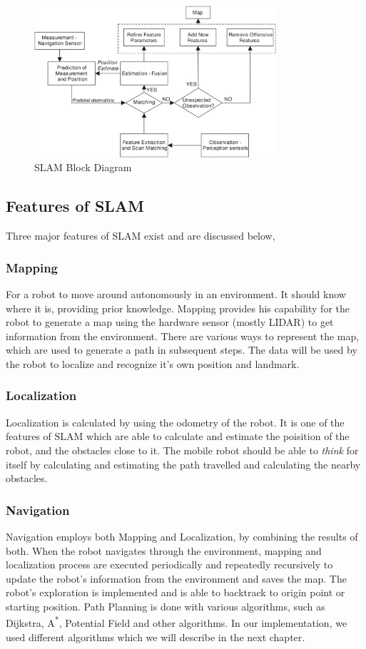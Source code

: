\begin{figure}[th]
    \centering
    \includegraphics[width=0.8\textwidth]{Figures/SLAM_Block_Final.jpeg}
    \decoRule
    \caption[]{SLAM Block Diagram \cite{7081165}}
    \label{fig:SLAMBlockDiagram}
\end{figure}

\subsection{Features of SLAM}
Three major features of SLAM exist and are discussed below,
\subsubsection{Mapping}
For a robot to move around autonomously in an environment. It should know where it is, providing prior knowledge. Mapping provides his capability for the robot to generate a map using the hardware sensor (mostly LIDAR) to get information from the environment.
There are various ways to represent the map, which are used to generate a path in subsequent steps. The data will be used by the robot to localize and recognize it's own position and landmark.
\subsubsection{Localization}
Localization is calculated by using the odometry of the robot. It is one of the features of SLAM which are able to calculate and estimate the poisition of the robot, and the obstacles close to it.
The mobile robot should be able to \textit{think} for itself by calculating and estimating the path travelled and calculating the nearby obstacles. 
\subsubsection{Navigation}
Navigation employs both Mapping and Localization, by combining the results of both. When the robot navigates through the environment, mapping and localization process are 
executed periodically and repeatedly recursively to update the robot's information from the environment and saves the map. The robot's exploration is implemented and is able to backtrack to origin point 
or starting position. Path Planning is done with various algorithms, such as Dijkstra, A\textsuperscript{*}, Potential Field and other algorithms. In our implementation, we used different algorithms which we will describe in the next chapter.

